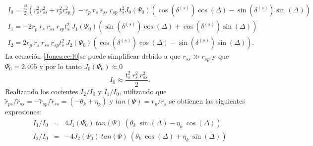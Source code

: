 \begin{subequations}
	\begin{gather}
	I_0=\frac{t_s ^2}{2}\left( r_s^2 r_{ss}^2 + r_p^2 r_{sp}^2 \right)-r_p~ r_s ~r_{ss} ~r_{sp} ~t_{s}^2 J_0(\Psi_0)(\cos(\delta^{(s)}) \cos(\Delta)-\sin(\delta^{(s)})\sin(\Delta)) \label{Jones:ec:I0}\\
	I_1=-2r_p ~r_s~ r_{ss}~ r_{sp} t_{s}^2~ J_{1}(\Psi_0) (\sin(\delta^{(s)}) \cos(\Delta)+\cos(\delta^{(s)})\sin(\Delta)) \label{Jones:ec:I1} \\
	I_2=2r_p ~r_s ~r_{ss}~ r_{sp} t_{s}^2~ J_2(\Psi_0)(\cos(\delta^{(s)}) \cos(\Delta)-\sin(\delta^{(s)})\sin(\Delta)). \label{Jones:ec:I2}
	\end{gather}
\end{subequations}
La ecuaci\'on \ref{Jones:ec:I0}se puede simplificar debido a que $r_{ss} \gg r_{sp}$ y que $\Psi_0 =2.405$ y por lo tanto $J_0(\Psi_0) \approx 0$
\begin{equation*}
I_0 \approx \frac{t_s^2~ r_s^2~ r_{ss}^2}{2}.
\end{equation*}
Realizando los cocientes $I_2/I_0$ y $I_1/I_0$, utilizando que $\tilde{r}_{ps} / \tilde{r}_{ss} = -  \tilde{r}_{sp} / \tilde{r}_{ss} =(- \theta_k + \eta_k)$ y $tan(\varPsi)=r_p/r_s$ \cite{Kim_1993} se obtienen las siguientes expresiones: 
\begin{eqnarray}
I_1/I_0 &=& 4 J_1 (\Psi_0) ~tan(\varPsi) ~(\theta_k ~\sin(\Delta) - \eta_k~ \cos(\Delta)) \label{Jones:ec:divI1}\\
I_2/I_0 &=& -4 J_2 (\Psi_0) ~tan(\varPsi) ~(\theta_k~\cos(\Delta) + \eta_k ~ \sin(\Delta))\label{Jones:ec:divI2}
\end{eqnarray}
\endinput